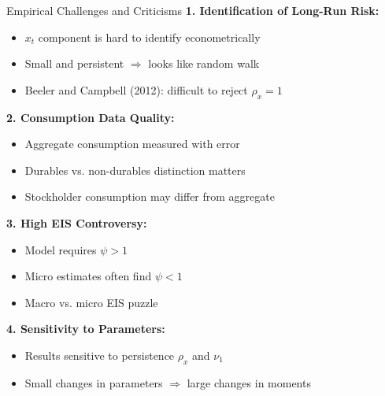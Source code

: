 \documentclass{beamer}
\begin{document}
\begin{frame}{Empirical Challenges and Criticisms}
    \textbf{1. Identification of Long-Run Risk:}
    \begin{itemize}
        \item $x_t$ component is hard to identify econometrically
        \item Small and persistent $\Rightarrow$ looks like random walk
        \item Beeler and Campbell (2012): difficult to reject $\rho_x = 1$
    \end{itemize}
    
    \textbf{2. Consumption Data Quality:}
    \begin{itemize}
        \item Aggregate consumption measured with error
        \item Durables vs. non-durables distinction matters
        \item Stockholder consumption may differ from aggregate
    \end{itemize}
    
    \textbf{3. High EIS Controversy:}
    \begin{itemize}
        \item Model requires $\psi > 1$
        \item Micro estimates often find $\psi < 1$
        \item Macro vs. micro EIS puzzle
    \end{itemize}
    
    \textbf{4. Sensitivity to Parameters:}
    \begin{itemize}
        \item Results sensitive to persistence $\rho_x$ and $\nu_1$
        \item Small changes in parameters $\Rightarrow$ large changes in moments
    \end{itemize}
\end{frame}
\end{document}
